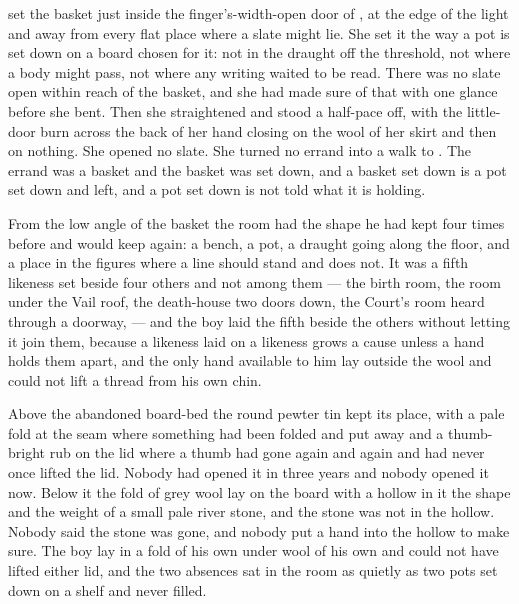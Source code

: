  set the basket just inside the finger's-width-open door of , at the edge of the light and away from every flat place where a slate might lie. She set it the way a pot is set down on a board chosen for it: not in the draught off the threshold, not where a body might pass, not where any writing waited to be read. There was no slate open within reach of the basket, and she had made sure of that with one glance before she bent. Then she straightened and stood a half-pace off, with the little-door burn across the back of her hand closing on the wool of her skirt and then on nothing. She opened no slate. She turned no errand into a walk to . The errand was a basket and the basket was set down, and a basket set down is a pot set down and left, and a pot set down is not told what it is holding.

From the low angle of the basket the room had the shape he had kept four times before and would keep again: a bench, a pot, a draught going along the floor, and a place in the figures where a line should stand and does not. It was a fifth likeness set beside four others and not among them --- the birth room, the room under the Vail roof, the death-house two doors down, the Court's room heard through a doorway,  --- and the boy laid the fifth beside the others without letting it join them, because a likeness laid on a likeness grows a cause unless a hand holds them apart, and the only hand available to him lay outside the wool and could not lift a thread from his own chin.

Above the abandoned board-bed the round pewter tin kept its place, with a pale fold at the seam where something had been folded and put away and a thumb-bright rub on the lid where a thumb had gone again and again and had never once lifted the lid. Nobody had opened it in three years and nobody opened it now. Below it the fold of grey wool lay on the board with a hollow in it the shape and the weight of a small pale river stone, and the stone was not in the hollow. Nobody said the stone was gone, and nobody put a hand into the hollow to make sure. The boy lay in a fold of his own under wool of his own and could not have lifted either lid, and the two absences sat in the room as quietly as two pots set down on a shelf and never filled.

